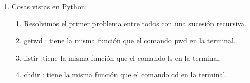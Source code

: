 \documentclass{article}
\begin{document}
\begin{enumerate}
\begin{enumerate}
\begin{enumerate}
			\end{enumerate}
		\end{enumerate}
		\item Cosas vistas en Python:
		\begin{enumerate}
			\item Resolvimos el primer problema entre todos con una sucesión recursiva.
			\item getwd : tiene la misma función que el comando pwd en la terminal.
			\item listir :tiene la misma función que el comando ls en la terminal.
			\item chdir : tiene la misma función que el comando cd en la terminal.
		\end{enumerate}
	\end{enumerate}
\end{document}
